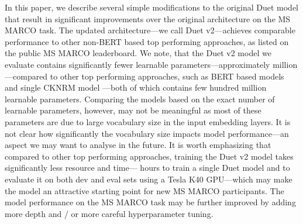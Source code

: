 \documentclass{article}
\begin{document}
In this paper, we describe several simple modifications to the original Duet model that result in significant improvements over the original architecture on the MS MARCO task.
The updated architecture---we call Duet v2---achieves comparable performance to other non-BERT based top performing approaches, as listed on the public MS MARCO leaderboard.
We note, that the Duet v2 model we evaluate contains significantly fewer learnable parameters---approximately  million---compared to other top performing approaches, such as BERT based models \citep{nogueira2019passage} and single CKNRM model \citep{dai2018convolutional}---both of which contains few hundred million learnable parameters.
Comparing the models based on the exact number of learnable parameters, however, may not be meaningful as most of these parameters are due to large vocabulary size in the input embedding layers.
It is not clear how significantly the vocabulary size impacts model performance---an aspect we may want to analyse in the future.
It is worth emphasizing that compared to other top performing approaches, training the Duet v2 model takes significantly less resource and time--- hours to train a single Duet model and to evaluate it on both dev and eval sets using a Tesla K40 GPU---which may make the model an attractive starting point for new MS MARCO participants.
The model performance on the MS MARCO task may be further improved by adding more depth and / or more careful hyperparameter tuning.
 


\end{document}
